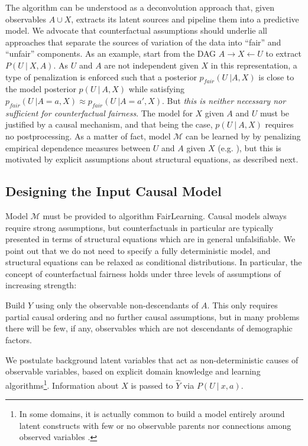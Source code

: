  The algorithm can be
understood as a deconvolution approach that, given observables $A \cup
X$, extracts its latent sources and pipeline them into a predictive
model. We advocate that counterfactual assumptions should underlie all
approaches that separate the sources of variation of the data into
``fair'' and ``unfair'' components. As an example,
\citet{louizos2015variational} start from the DAG $A \rightarrow X
\leftarrow U$ to extract $P(U\ |\ X, A)$. As $U$ and $A$ are not
independent given $X$ in this representation, a type of penalization
is enforced such that a posterior $p_{fair}(U\ | A, X)$ is close to
the model posterior $p(U\ |\ A, X)$ while satisfying $p_{fair}(U\ | A
= a, X) \approx p_{fair}(U\ | A = a', X)$. But {\it this is neither
  necessary nor sufficient for counterfactual fairness}. The model for
$X$ given $A$ and $U$ must be justified by a causal mechanism, and
that being the case, $p(U\ |\ A, X)$ requires no postprocessing. As a
matter of fact, model $\mathcal M$ can be learned by by penalizing
empirical dependence measures between $U$ and $A$ given $X$
(e.g. \citet{mooij:09}), but this is motivated by explicit assumptions
about structural equations, as described next.

\subsection{Designing the Input Causal Model}
\label{sec:limit-guide-model}

Model $\mathcal M$ must be provided to algorithm {\sc FairLearning}.
Causal models always require strong assumptions, but counterfactuals
in particular are typically presented in terms of structural equations
which are in general unfalsifiable. We point out that we do not need
to specify a fully deterministic model, and structural equations can
be relaxed as conditional distributions. In particular, the concept of
counterfactual fairness holds under three levels of assumptions of
increasing strength:

  Build $\hat Y$ using only the observable
non-descendants of $A$.  This only requires partial causal ordering
and no further causal assumptions, but in many problems there will be
few, if any, observables which are not descendants of demographic
factors.
  
 We postulate background latent variables that
act as non-deterministic causes of observable variables, based on
explicit domain knowledge and learning algorithms\footnote{In some
  domains, it is actually common to build a model entirely around
  latent constructs with few or no observable parents nor connections
  among observed variables \citep{bol:89}.}. Information about $X$ is
passed to $\hat Y$ via $P(U\ |\ x, a)$.

